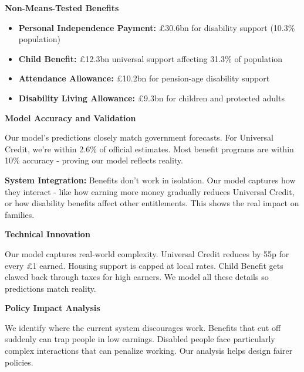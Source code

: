 \documentclass[a4paper,11pt]{article}
\newcommand{\highlightbox}[1]{%
    \begin{tcolorbox}[
        colback=lightblue,
        colframe=darkblue,
        leftrule=4mm,
        rightrule=0mm,
        toprule=0mm,
        bottomrule=0mm,
        sharp corners
    ]
    #1
    \end{tcolorbox}
}
\begin{document}
\vspace{15pt}

\begin{tcolorbox}[
    colback=lightgray,
    colframe=mediumblue,
    rounded corners,
    leftrule=3mm,
    rightrule=0mm,
    toprule=0mm,
    bottomrule=0mm
]
\textbf{\color{darkblue}Non-Means-Tested Benefits}

\begin{itemize}[leftmargin=15pt]
\item \textbf{Personal Independence Payment:} £30.6bn for disability support (10.3\% population)
\item \textbf{Child Benefit:} £12.3bn universal support affecting 31.3\% of population
\item \textbf{Attendance Allowance:} £10.2bn for pension-age disability support
\item \textbf{Disability Living Allowance:} £9.3bn for children and protected adults
\end{itemize}
\end{tcolorbox}

\vspace{15pt}

\textbf{Model Accuracy and Validation}

Our model's predictions closely match government forecasts. For Universal Credit, we're within 2.6\% of official estimates. Most benefit programs are within 10\% accuracy - proving our model reflects reality.

\vspace{15pt}

\highlightbox{
\textbf{System Integration:} Benefits don't work in isolation. Our model captures how they interact - like how earning more money gradually reduces Universal Credit, or how disability benefits affect other entitlements. This shows the real impact on families.
}

\vspace{15pt}

\textbf{Technical Innovation}

Our model captures real-world complexity. Universal Credit reduces by 55p for every £1 earned. Housing support is capped at local rates. Child Benefit gets clawed back through taxes for high earners. We model all these details so predictions match reality.

\vspace{10pt}

\textbf{Policy Impact Analysis}

We identify where the current system discourages work. Benefits that cut off suddenly can trap people in low earnings. Disabled people face particularly complex interactions that can penalize working. Our analysis helps design fairer policies.
\end{document}
